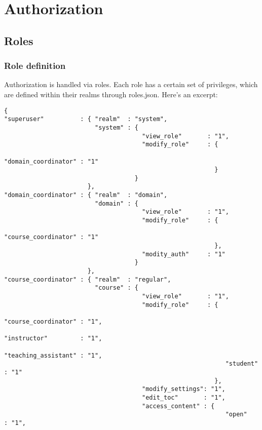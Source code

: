 \chapter{Authorization}
\section{Roles}\label{roles}
\subsection{Role definition}
Authorization is handled via roles. Each role has a certain set of privileges, which are defined within their realms through roles.json. Here's an excerpt:
\begin{verbatim}
{
"superuser"          : { "realm"  : "system",
                         "system" : {
                                      "view_role"       : "1",
                                      "modify_role"     : {
                                                             "domain_coordinator" : "1"
                                                          }
                                    }
                       },
"domain_coordinator" : { "realm"  : "domain",
                         "domain" : {
                                      "view_role"       : "1",
                                      "modify_role"     : {
                                                             "course_coordinator" : "1"
                                                          },
                                      "modity_auth"     : "1"
                                    }
                       },
"course_coordinator" : { "realm"  : "regular",
                         "course" : {
                                      "view_role"       : "1",
                                      "modify_role"     : {
                                                             "course_coordinator" : "1",
                                                             "instructor"         : "1",
                                                             "teaching_assistant" : "1",
                                                             "student"            : "1"
                                                          },
                                      "modify_settings": "1",
                                      "edit_toc"       : "1",
                                      "access_content" : {
                                                             "open"               : "1",

\end{verbatim}
